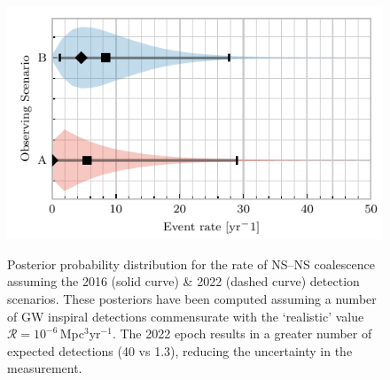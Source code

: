 \documentclass[twocolumn,nofootinbib]{revtex4-1}
\newcommand{\cbcrate}{{{\mathcal R}}}
\newcommand{\BNS}{\ac{NS}--\ac{NS}\xspace}
\begin{document}
\begin{figure}
\centering
{\includegraphics[width=\linewidth]{rate_posteriors_violin.pdf}}
\caption{Posterior probability distribution for the rate of \BNS coalescence assuming the 2016 (solid curve) \& 2022 (dashed curve) detection scenarios.
    These posteriors have been computed assuming a number of \ac{GW} inspiral detections commensurate with the `realistic' value $\cbcrate=10^{-6}$\,Mpc$^{3}$yr$^{-1}$.
    The 2022 epoch results in a greater number of expected detections (40 vs 1.3), reducing the uncertainty in the measurement.
    \label{fig:aligorate}}
\end{figure}
\end{document}
